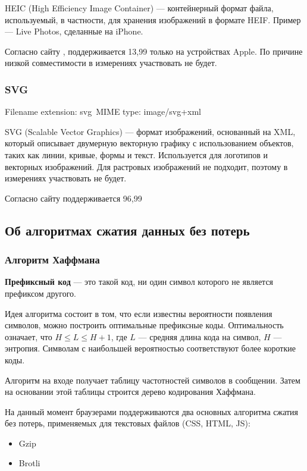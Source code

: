 \documentclass[12pt]{article}
\begin{document}
HEIC (High Efficiency Image Container) — контейнерный формат файла,
используемый, в частности, для хранения изображений в формате HEIF.
Пример — Live Photos, сделанные на iPhone.

Согласно сайту \cite{caniuse}, поддерживается 13,99%
только на устройствах Apple. По причине низкой совместимости в измерениях участвовать не будет.

\subsubsection{SVG}
Filename extension: svg\
MIME type: image/svg+xml

SVG (Scalable Vector Graphics) — формат изображений, основанный на XML,
который описывает двумерную векторную графику с использованием объектов,
таких как линии, кривые, формы и текст. Используется для логотипов и векторных изображений.
Для растровых изображений не подходит, поэтому в измерениях участвовать не будет.

Согласно сайту \cite{caniuse} поддерживается 96,99%

\subsection{Об алгоритмах сжатия данных без потерь}

\subsubsection{Алгоритм Хаффмана}

\textbf{Префиксный код} — это такой код, ни один символ которого не является префиксом другого.

Идея алгоритма состоит в том, что если известны вероятности появления символов,
можно построить оптимальные префиксные коды. Оптимальность
означает, что $H \leq L \leq H + 1$, где $L$ — средняя длина кода на символ, $H$ — энтропия.
Символам с наибольшей вероятностью соответствуют более короткие коды.

Алгоритм на входе получает таблицу частотностей символов в сообщении.
Затем на основании этой таблицы строится дерево кодирования Хаффмана.

На данный момент браузерами поддерживаются два основных алгоритма сжатия без потерь,
применяемых для текстовых файлов (CSS, HTML, JS):

\begin{itemize}
    \item Gzip
    \item Brotli
\end{itemize}
\end{document}
